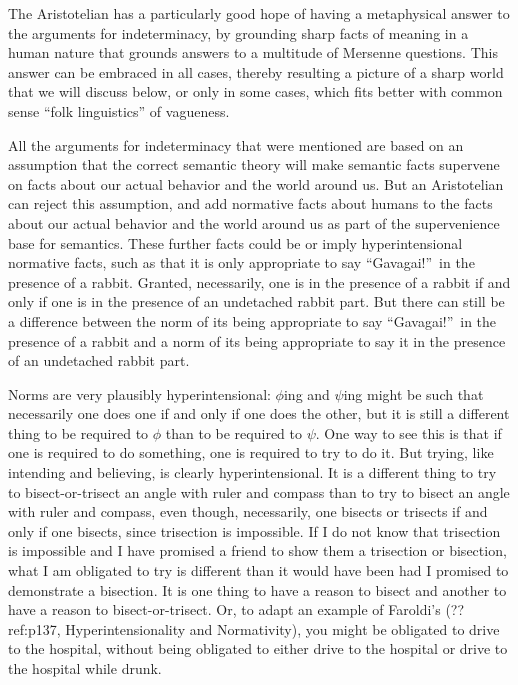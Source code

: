 The Aristotelian has a particularly good hope of having a metaphysical answer to the arguments for indeterminacy,
by grounding sharp facts of meaning in a human nature that grounds answers to a multitude of Mersenne questions.
This answer can be embraced in all cases, thereby resulting a picture of a sharp world that we will discuss below, 
or only in some cases, which fits better with common sense ``folk linguistics'' of vagueness.

All the arguments for indeterminacy that were mentioned are based on an assumption that the correct semantic theory will make semantic facts supervene on
facts about our actual behavior and the world around us. But an Aristotelian can reject this assumption, and add normative facts about humans 
to the facts about our actual behavior and the world around us as part of the supervenience base for semantics. These further
facts could be or imply hyperintensional normative
facts, such as that it is only appropriate to say ``Gavagai!''\ in the presence of a rabbit. Granted, necessarily, one is in the
presence of a rabbit if and only if one is in the presence of an undetached rabbit part. But there can still be a difference between
the norm of its being appropriate to say ``Gavagai!''\ in the presence of a rabbit and a norm of its being appropriate to say it 
in the presence of an undetached rabbit part.

Norms are very plausibly hyperintensional: $\phi$ing and $\psi$ing might be such that necessarily one does one if and only if one does the other,
but it is still a different thing to be required to $\phi$ than to be required to $\psi$. One way to see this is that if one
is required to do something, one is required to try to do it. But trying, like intending and believing, is clearly hyperintensional.
It is a different thing to try to bisect-or-trisect an angle with ruler and compass than to try to bisect an angle with ruler and 
compass, even though, necessarily, one bisects or trisects if and only if one bisects, since trisection is impossible. If I do not
know that trisection is impossible and I have promised a friend to show them a trisection or bisection, what I am obligated to try
is different than it would have been had I promised to demonstrate a bisection. 
It is one thing to have a reason to bisect and another to have a reason to bisect-or-trisect. Or, to adapt an example of 
Faroldi's (??ref:p137, Hyperintensionality
and Normativity), you might be obligated to drive to the hospital, without being obligated to either drive to the hospital or 
drive to the hospital while drunk. 

